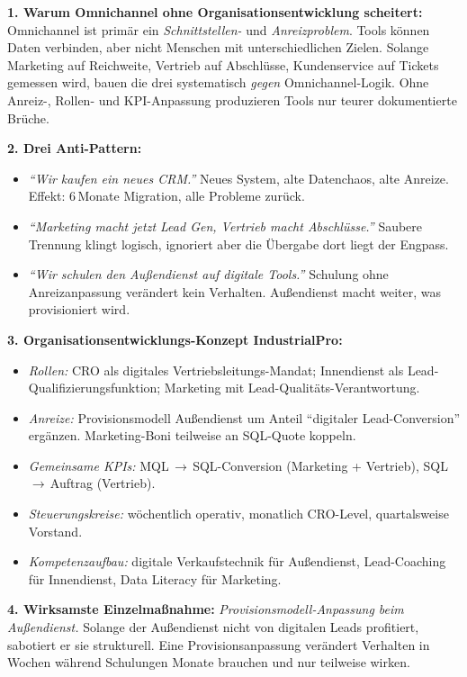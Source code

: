 \documentclass[11pt,a4paper,oneside]{article}
\begin{document}
\begin{loesungbox}
\textbf{1. Warum Omnichannel ohne Organisationsentwicklung scheitert:}
Omnichannel ist primär ein \emph{Schnittstellen-} und \emph{Anreizproblem}. Tools können Daten verbinden, aber nicht Menschen mit unterschiedlichen Zielen. Solange Marketing auf Reichweite, Vertrieb auf Abschlüsse, Kundenservice auf Tickets gemessen wird, bauen die drei systematisch \emph{gegen} Omnichannel-Logik. Ohne Anreiz-, Rollen- und KPI-Anpassung produzieren Tools nur teurer dokumentierte Brüche.

\textbf{2. Drei Anti-Pattern:}
\begin{itemize}
  \item \emph{``Wir kaufen ein neues CRM.''} Neues System, alte Datenchaos, alte Anreize. Effekt: 6\,Monate Migration, alle Probleme zurück.
  \item \emph{``Marketing macht jetzt Lead Gen, Vertrieb macht Abschlüsse.''} Saubere Trennung klingt logisch, ignoriert aber die Übergabe \textendash{} dort liegt der Engpass.
  \item \emph{``Wir schulen den Außendienst auf digitale Tools.''} Schulung ohne Anreizanpassung verändert kein Verhalten. Außendienst macht weiter, was provisioniert wird.
\end{itemize}

\textbf{3. Organisationsentwicklungs-Konzept IndustrialPro:}
\begin{itemize}
  \item \emph{Rollen:} CRO als digitales Vertriebsleitungs-Mandat; Innendienst als Lead-Qualifizierungsfunktion; Marketing mit Lead-Qualitäts-Verantwortung.
  \item \emph{Anreize:} Provisionsmodell Außendienst um Anteil ``digitaler Lead-Conversion'' ergänzen. Marketing-Boni teilweise an SQL-Quote koppeln.
  \item \emph{Gemeinsame KPIs:} MQL\,$\rightarrow$\,SQL-Conversion (Marketing + Vertrieb), SQL\,$\rightarrow$\,Auftrag (Vertrieb).
  \item \emph{Steuerungskreise:} wöchentlich operativ, monatlich CRO-Level, quartalsweise Vorstand.
  \item \emph{Kompetenzaufbau:} digitale Verkaufstechnik für Außendienst, Lead-Coaching für Innendienst, Data Literacy für Marketing.
\end{itemize}

\textbf{4. Wirksamste Einzelmaßnahme:}
\emph{Provisionsmodell-Anpassung beim Außendienst.} Solange der Außendienst nicht von digitalen Leads profitiert, sabotiert er sie strukturell. Eine Provisionsanpassung verändert Verhalten in Wochen \textendash{} während Schulungen Monate brauchen und nur teilweise wirken.


\end{loesungbox}
\end{document}

